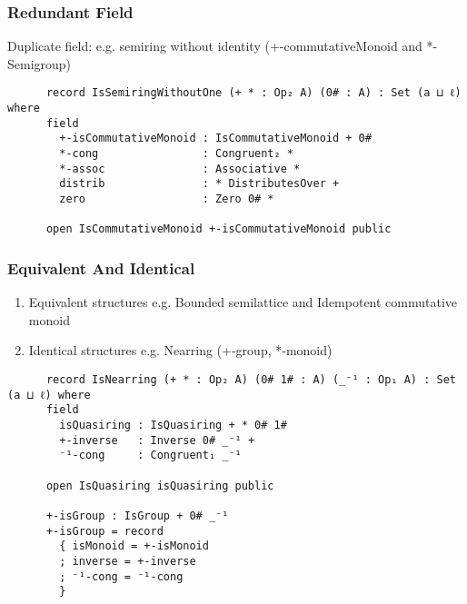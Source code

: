 \documentclass[xcolor={dvipsnames}]{beamer}
\begin{document}

\begin{frame}[fragile]
  \frametitle{Redundant Field}

  Duplicate field: e.g. semiring without identity (+-commutativeMonoid and *-Semigroup)

    \begin{verbatim}
      record IsSemiringWithoutOne (+ * : Op₂ A) (0# : A) : Set (a ⊔ ℓ) where
      field
        +-isCommutativeMonoid : IsCommutativeMonoid + 0#
        *-cong                : Congruent₂ *
        *-assoc               : Associative *
        distrib               : * DistributesOver +
        zero                  : Zero 0# *
      
      open IsCommutativeMonoid +-isCommutativeMonoid public
    \end{verbatim}
\end{frame}


\begin{frame}[fragile]
  \frametitle{Equivalent And Identical}
  \begin{enumerate} 
    \item Equivalent structures e.g. Bounded semilattice and Idempotent commutative monoid
    \item Identical structures e.g. Nearring (+-group, *-monoid)
  \end{enumerate}

    \begin{verbatim}
      record IsNearring (+ * : Op₂ A) (0# 1# : A) (_⁻¹ : Op₁ A) : Set (a ⊔ ℓ) where
      field
        isQuasiring : IsQuasiring + * 0# 1#
        +-inverse   : Inverse 0# _⁻¹ +
        ⁻¹-cong     : Congruent₁ _⁻¹
      
      open IsQuasiring isQuasiring public

      +-isGroup : IsGroup + 0# _⁻¹
      +-isGroup = record 
        { isMonoid = +-isMonoid 
        ; inverse = +-inverse 
        ; ⁻¹-cong = ⁻¹-cong 
        }
    \end{verbatim}
\end{frame}
\end{document}
